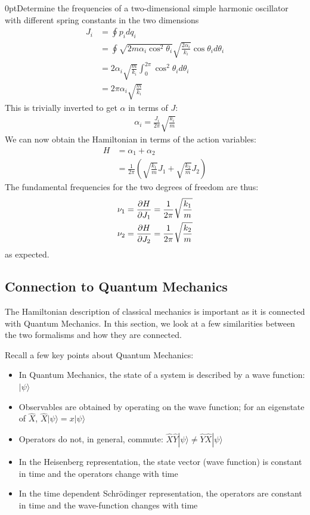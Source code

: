 \begin{example}{0pt}{Determine the frequencies of a two-dimensional simple harmonic oscillator with different spring constants in the two dimensions}{}
\begin{align*}
J_i&=\oint p_i dq_i\\
&=\oint \sqrt{2m\alpha_i\cos^2\theta_i} \sqrt{\frac{2\alpha_i}{k_i}}\cos\theta_id\theta_i\\
&=2\alpha_i\sqrt{\frac{m}{k_i}}\int_0^{2\pi} \cos^2\theta_i d\theta_i\\
&=2\pi\alpha_i\sqrt{\frac{m}{k_i}}
\end{align*}
This is trivially inverted to get $\alpha$ in terms of $J$:
\begin{align*}
\alpha_i=\frac{J_i}{2\pi}\sqrt{\frac{k_i}{m}}
\end{align*}
We can now obtain the Hamiltonian in terms of the action variables:
\begin{align*}
H&=\alpha_1+\alpha_2\\
&=\frac{1}{2\pi}\left(\sqrt{\frac{k_1}{m}}J_1+\sqrt{\frac{k_2}{m}}J_2\right)
\end{align*}
The fundamental frequencies for the two degrees of freedom are thus:
\begin{align*}
\nu_1&=\frac{\partial H}{\partial J_1}=\frac{1}{2\pi}\sqrt{\frac{k_1}{m}}\\
\nu_2&=\frac{\partial H}{\partial J_2}=\frac{1}{2\pi}\sqrt{\frac{k_2}{m}}
\end{align*}
as expected.
\label{ex:AASHO}
\end{example}

\subsection{Connection to Quantum Mechanics}
The Hamiltonian description of classical mechanics is important as it is connected with Quantum Mechanics. In this section, we look at a few similarities between the two formalisms and how they are connected.

Recall a few key points about Quantum Mechanics:
\begin{itemize}
\item In Quantum Mechanics, the state of a system is described by a wave function: $|\psi\rangle$
\item Observables are obtained by operating on the wave function; for an eigenstate of $\hat X$, $\hat X|\psi\rangle=x|\psi\rangle$
\item Operators do not, in general, commute: $\hat X\hat Y|\psi\rangle\neq\hat Y \hat X|\psi\rangle$
\item In the Heisenberg representation, the state vector (wave function) is constant in time and the operators change with time
\item In the time dependent Schr\"odinger representation, the operators are constant in time and the wave-function changes with time
\end{itemize}

